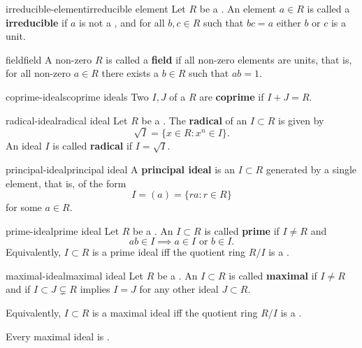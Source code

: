 \begin{topic}{irreducible-element}{irreducible element}
    Let $R$ be a . An element $a \in R$ is called a \textbf{irreducible} if $a$ is not a , and for all $b, c \in R$ such that $bc = a$ either $b$ or $c$ is a unit.
\end{topic}

\begin{topic}{field}{field}
    A non-zero  $R$ is called a \textbf{field} if all non-zero elements are units, that is, for all non-zero $a \in R$ there exists a $b \in R$ such that $ab = 1$. 
\end{topic}

\begin{topic}{coprime-ideals}{coprime ideals}
    Two  $I, J$ of a  $R$ are \textbf{coprime} if $I + J = R$.
\end{topic}

\begin{topic}{radical-ideal}{radical ideal}
    Let $R$ be a . The \textbf{radical} of an  $I \subset R$ is given by
    \[ \sqrt{I} = \{ x \in R : x^n \in I \} . \]
    An ideal $I$ is called \textbf{radical} if $I = \sqrt{I}$.
\end{topic}

\begin{topic}{principal-ideal}{principal ideal}
    A \textbf{principal ideal} is an  $I \subset R$ generated by a single element, that is, of the form
    \[ I = (a) = \{ r a : r \in R \} \]
    for some $a \in R$.
\end{topic}

\begin{topic}{prime-ideal}{prime ideal}
    Let $R$ be a . An  $I \subset R$ is called \textbf{prime} if $I \ne R$ and
    \[ ab \in I \implies a \in I \text{ or } b \in I . \]
    Equivalently, $I \subset R$ is a prime ideal iff the quotient ring $R / I$ is a .
\end{topic}

\begin{topic}{maximal-ideal}{maximal ideal}
    Let $R$ be a . An  $I \subset R$ is called \textbf{maximal} if $I \ne R$ and if $I \subset J \subsetneq R$ implies $I = J$ for any other ideal $J \subset R$.
    
    Equivalently, $I \subset R$ is a maximal ideal iff the quotient ring $R / I$ is a .
    
    Every maximal ideal is .
\end{topic}

